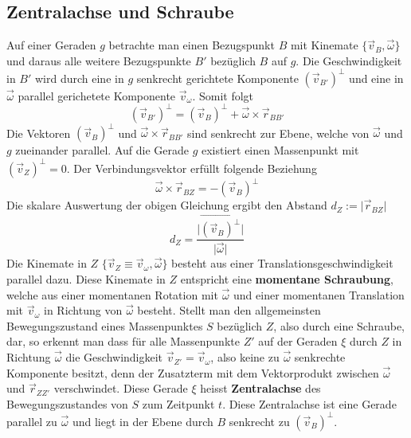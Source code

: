 \subsection{Zentralachse und Schraube}
Auf einer Geraden $g$ betrachte man einen Bezugspunkt $B$ mit Kinemate $\{\overrightarrow{v}_B, \overrightarrow{\omega}\}$ und daraus alle weitere Bezugspunkte $B'$ bezüglich $B$ auf $g$. Die Geschwindigkeit in $B'$ wird durch eine in $g$ senkrecht gerichtete Komponente $\left(\overrightarrow{v}_{B'}\right)^{\perp}$ und eine in $\overrightarrow{\omega}$ parallel gerichetete Komponente $\overrightarrow{v}_{\omega}$. Somit folgt
\begin{equation}
\boxed{\left(\overrightarrow{v}_{B'}\right)^{\perp}=\left(\overrightarrow{v}_B\right)^{\perp}+\overrightarrow{\omega}\times \overrightarrow{r}_{BB'}}
\end{equation}
Die Vektoren $\left(\overrightarrow{v}_B\right)^{\perp}$ und $\overrightarrow{\omega}\times \overrightarrow{r}_{BB'}$ sind senkrecht zur Ebene, welche von $\overrightarrow{\omega}$ und $g$ zueinander parallel. Auf die Gerade $g$ existiert einen Massenpunkt mit $\left(\overrightarrow{v}_Z\right)^{\perp}=0$. Der Verbindungsvektor erfüllt folgende Beziehung
\begin{equation}
\boxed{\overrightarrow{\omega}\times \overrightarrow{r}_{BZ}=-\left(\overrightarrow{v}_B\right)^{\perp}}
\end{equation}
Die skalare Auswertung der obigen Gleichung ergibt den Abstand $d_Z:=\Big\vert\overrightarrow{r}_{BZ}\Big\vert$
\begin{equation}
\boxed{d_Z=\dfrac{\Big\vert\overrightarrow{\left(\overrightarrow{v}_B\right)^{\perp}}\Big\vert}{\Big\vert\overrightarrow{\omega}\Big\vert}}
\end{equation}
Die Kinemate in $Z$ $\{\overrightarrow{v}_Z\equiv \overrightarrow{v}_{\omega}, \overrightarrow{\omega}\}$ besteht aus einer Translationsgeschwindigkeit parallel dazu. Diese Kinemate in $Z$ entspricht eine \textbf{momentane Schraubung}, welche aus einer momentanen Rotation mit $\overrightarrow{\omega}$ und einer momentanen Translation mit $\overrightarrow{v}_{\omega}$ in Richtung von $\overrightarrow{\omega}$ besteht.
\newline\newline
Stellt man den allgemeinsten Bewegungszustand eines Massenpunktes $S$ bezüglich $Z$, also durch eine Schraube, dar, so erkennt man dass für alle Massenpunkte $Z'$ auf der Geraden $\xi$ durch $Z$ in Richtung $\overrightarrow{\omega}$ die Geschwindigkeit $\overrightarrow{v}_{Z'}=\overrightarrow{v}_{\omega}$, also keine zu $\overrightarrow{\omega}$ senkrechte Komponente besitzt, denn der Zusatzterm mit dem Vektorprodukt zwischen $\overrightarrow{\omega}$ und $\overrightarrow{r}_{ZZ'}$ verschwindet. Diese Gerade $\xi$ heisst \textbf{Zentralachse} des Bewegungszustandes von $S$ zum Zeitpunkt $t$. Diese Zentralachse ist eine Gerade parallel zu $\overrightarrow{\omega}$ und liegt in der Ebene durch $B$ senkrecht zu $\left(\overrightarrow{v}_B\right)^{\perp}$.
